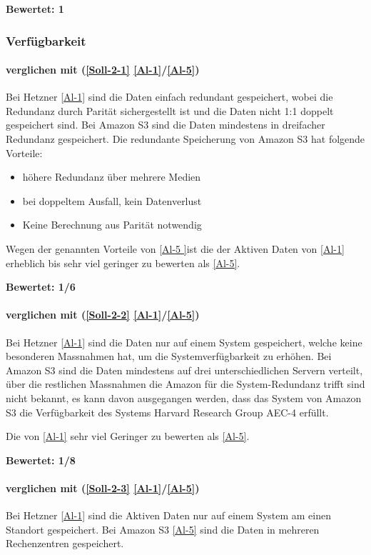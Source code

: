 \textbf{Bewertet: 1}


\subsubsection{Verfügbarkeit}

\paragraph*{  verglichen mit  (\ref{Soll-2-1} \ref{Al-1}/\ref{Al-5})}
Bei Hetzner \ref{Al-1} sind die Daten einfach redundant gespeichert, wobei die Redundanz durch Parität sichergestellt ist und die Daten nicht 1:1 doppelt gespeichert sind. Bei Amazon S3 sind die Daten mindestens in dreifacher Redundanz gespeichert. Die redundante Speicherung von Amazon S3 hat folgende Vorteile:

\begin{itemize}
\item höhere Redundanz über mehrere Medien
\item bei doppeltem Ausfall, kein Datenverlust
\item Keine Berechnung aus Parität notwendig
\end{itemize}

Wegen der genannten Vorteile von \ref{Al-5 }ist die  der Aktiven Daten von \ref{Al-1} erheblich bis sehr viel geringer zu bewerten als \ref{Al-5}.

\textbf{Bewertet: 1/6}

\paragraph*{  verglichen mit  (\ref{Soll-2-2} \ref{Al-1}/\ref{Al-5})}
Bei Hetzner \ref{Al-1} sind die Daten nur auf einem System gespeichert, welche keine besonderen Massnahmen hat, um die Systemverfügbarkeit zu erhöhen. Bei Amazon S3 sind die Daten mindestens auf drei unterschiedlichen Servern verteilt, über die restlichen Massnahmen die Amazon für die System-Redundanz trifft sind nicht bekannt, es kann davon ausgegangen werden, dass das System von Amazon S3 die Verfügbarkeit des Systems Harvard Research Group AEC-4 erfüllt.

Die  von \ref{Al-1} sehr viel Geringer zu bewerten als \ref{Al-5}.

\textbf{Bewertet: 1/8}

\paragraph*{  verglichen mit  (\ref{Soll-2-3} \ref{Al-1}/\ref{Al-5})}
Bei Hetzner \ref{Al-1} sind die Aktiven Daten nur auf einem System am einen Standort gespeichert. Bei Amazon S3 \ref{Al-5} sind die Daten in mehreren Rechenzentren gespeichert.

